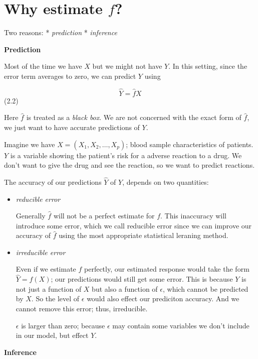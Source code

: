 \documentclass[
  letterpaper,
  DIV=11,
  numbers=noendperiod]{scrreprt}
\begin{document}
\hypertarget{why-estimate-f}{%
\section{\texorpdfstring{Why estimate
\(f\)?}{Why estimate f?}}\label{why-estimate-f}}

Two reasons: * \emph{prediction} * \emph{inference}

\textbf{Prediction}

Most of the time we have \(X\) but we might not have \(Y\). In this
setting, since the error term averages to zero, we can predict \(Y\)
using

\[
\hat{Y} = \hat{f}X
\] (2.2)

Here \(\hat{f}\) is treated as a \emph{black box}. We are not concerned
with the exact form of \(\hat{f}\), we just want to have accurate
predictions of \(Y\).

Imagine we have \(X = (X_1, X_2, \dots, X_p)\); blood sample
characteristics of patients. \(Y\) is a variable showing the patient's
risk for a adverse reaction to a drug. We don't want to give the drug
and see the reaction, so we want to predict reactions.

The accuracy of our predictions \(\hat{Y}\) of \(Y\), depends on two
quantities:

\begin{itemize}
\item
  \emph{reducible error}

  Generally \(\hat{f}\) will not be a perfect estimate for \(f\). This
  inaccuracy will introduce some error, which we call reducible error
  since we can improve our accuracy of \(\hat{f}\) using the most
  appropriate statistical leraning method.
\item
  \emph{irreducible error}

  Even if we estimate \(f\) perfectly, our estimated response would take
  the form \(\hat{Y} = f(X)\); our predictions would still get some
  error. This is because \(Y\) is not just a function of \(X\) but also
  a function of \(\epsilon\), which cannot be predicted by \(X\). So the
  level of \(\epsilon\) would also effect our prediciton accuracy. And
  we cannot remove this error; thus, irreducible.

  \(\epsilon\) is larger than zero; because \(\epsilon\) may contain
  some variables we don't include in our model, but effect \(Y\).
\end{itemize}

\textbf{Inference}
\end{document}
